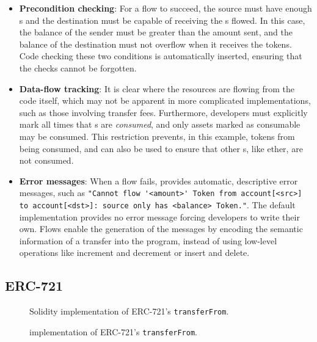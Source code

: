 \documentclass[dvipsnames, usenames, sigconf]{acmart}
\begin{document}
\begin{itemize}
    \item \textbf{Precondition checking}: For a flow to succeed, the source must have enough \assetTxt{}s and the destination must be capable of receiving the \assetTxt{}s flowed.
        In this case, the balance of the sender must be greater than the amount sent, and the balance of the destination must not overflow when it receives the tokens.
        Code checking these two conditions is automatically inserted, ensuring that the checks cannot be forgotten.
    \item \textbf{Data-flow tracking}: It is clear where the resources are flowing from the code itself, which may not be apparent in more complicated implementations, such as those involving transfer fees.
        Furthermore, developers must explicitly mark all times that \assetTxt{}s are \emph{consumed}, and only assets marked as consumable may be consumed.
        This restriction prevents, in this example, tokens from being consumed, and can also be used to ensure that other \assetTxt{}s, like ether, are not consumed.
    \item \textbf{Error messages}: When a flow fails, \langName provides automatic, descriptive error messages, such as \lstinline{"Cannot flow '<amount>' Token from account[<src>] to account[<dst>]: source only has <balance> Token."}.
        The default implementation provides no error message forcing developers to write their own.
        Flows enable the generation of the messages by encoding the semantic information of a transfer into the program, instead of using low-level operations like increment and decrement or insert and delete.
\end{itemize}

\subsection{ERC-721}\label{sec:erc721-impl}
\begin{figure*}[h]
    \centering
    \begin{subfigure}[t]{0.5\textwidth}
        \centering
        
        \caption{Solidity implementation of ERC-721's \lstinline{transferFrom}.}
        \label{fig:erc721-impl-sol}
    \end{subfigure}%
    \begin{subfigure}[t]{0.5\textwidth}
        \centering
        
        \caption{\langName implementation of ERC-721's \lstinline{transferFrom}.}
        \label{fig:erc721-impl-flow}
    \end{subfigure}
    \label{fig:erc721-impl}
\end{figure*}
\end{document}
